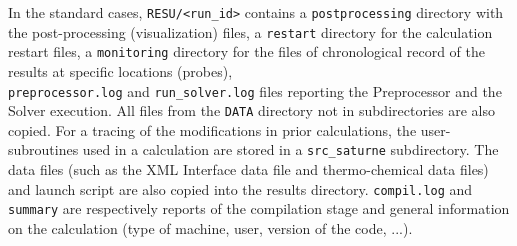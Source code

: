 \noindent
In the standard cases, \texttt{RESU/<run\_id>} contains a
\texttt{postprocessing} directory with the post-processing
(visualization) files, a \texttt{restart} directory for the calculation
restart files, a \texttt{monitoring} directory for the files of chronological
record of the results at specific locations (probes),\\
\texttt{preprocessor.log} and \texttt{run\_solver.log} files reporting the
Preprocessor and the Solver execution. All files from the \texttt{DATA}
directory not in subdirectories are also copied. For a tracing of
the modifications in prior calculations, the user-subroutines used in
a calculation are stored in a \texttt{src\_saturne} subdirectory. The data files
(such as the XML Interface data file and thermo-chemical data files) and
launch script are also copied into the results directory. \texttt{compil.log} and
\texttt{summary} are respectively reports of the compilation stage and
general information on the calculation (type of machine, user,
version of the code, ...).

